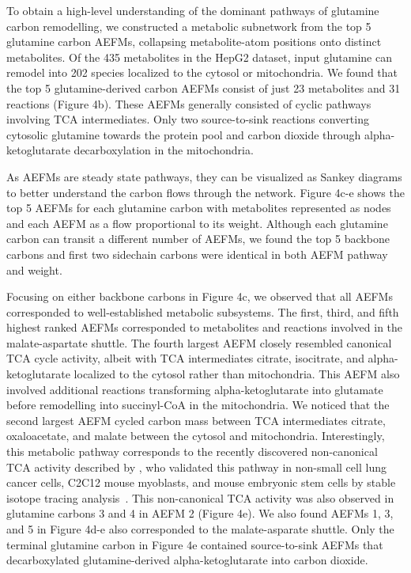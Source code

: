 \documentclass[12pt]{article}
\begin{document}

To obtain a high-level understanding of the dominant pathways of glutamine
carbon remodelling, we constructed a metabolic subnetwork from the top
5 glutamine carbon AEFMs, collapsing metabolite-atom positions onto distinct
metabolites. Of the 435 metabolites in the HepG2 dataset, input glutamine
can remodel into 202 species localized to the cytosol or mitochondria. We
found that the top 5 glutamine-derived carbon AEFMs consist of just 23
metabolites and 31 reactions (Figure 4b). These AEFMs generally consisted
of cyclic pathways involving TCA intermediates. Only two source-to-sink
reactions converting cytosolic glutamine towards the protein pool and
carbon dioxide through alpha-ketoglutarate decarboxylation in the
mitochondria. 

As AEFMs are steady state pathways, they can be visualized as Sankey
diagrams to better understand the carbon flows through the network. Figure
4c-e shows the top 5 AEFMs for each glutamine carbon with metabolites
represented as nodes and each AEFM as a flow proportional to its weight.
Although each glutamine carbon can transit a different number of AEFMs, we
found the top 5 backbone carbons and first two sidechain carbons were
identical in both AEFM pathway and weight.
    
Focusing on either backbone carbons in Figure 4c, we observed that all
AEFMs corresponded to well-established metabolic subsystems. The first,
third, and fifth highest ranked AEFMs corresponded to metabolites and
reactions involved in the malate-aspartate shuttle. The fourth largest
AEFM closely resembled canonical TCA cycle activity, albeit with TCA
intermediates citrate, isocitrate, and alpha-ketoglutarate localized to
the cytosol rather than mitochondria. This AEFM also involved additional
reactions transforming alpha-ketoglutarate into glutamate before
remodelling into succinyl-CoA in the mitochondria. We noticed that the
second largest AEFM cycled carbon mass between TCA intermediates citrate,
oxaloacetate, and malate between the cytosol and mitochondria.
Interestingly, this metabolic pathway corresponds to the recently
discovered non-canonical TCA activity described by
\citeauthor{ArnoldPaigeK2022Anta}, who validated this pathway in non-small
cell lung cancer cells, C2C12 mouse myoblasts, and mouse embryonic stem
cells by stable isotope tracing analysis~\citep{ArnoldPaigeK2022Anta}.
This non-canonical TCA activity was also observed in glutamine carbons
3 and 4 in AEFM 2 (Figure 4e). We also found AEFMs 1, 3, and 5 in Figure
  4d-e also corresponded to the malate-asparate shuttle. Only the terminal
  glutamine carbon in Figure 4e contained source-to-sink AEFMs that
  decarboxylated glutamine-derived alpha-ketoglutarate into carbon
  dioxide.
\end{document}
